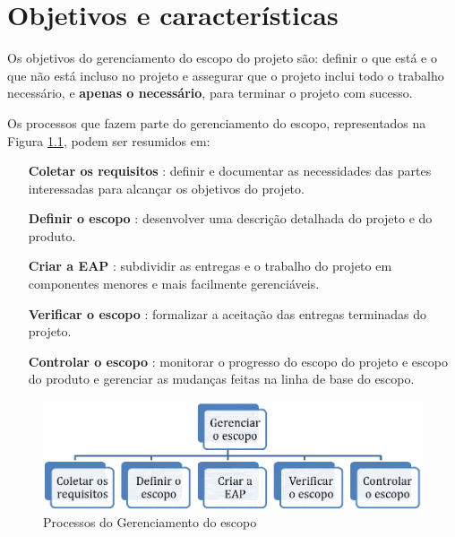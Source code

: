\chapter{Objetivos e características}

Os objetivos do gerenciamento do escopo do projeto são: definir o que está e o que não está incluso no projeto e assegurar que o projeto inclui todo o trabalho necessário, e \textbf{apenas o necessário}, para terminar o projeto com sucesso.

Os processos que fazem parte do gerenciamento do escopo, representados na Figura \ref{fig:proc:ger:escopo}, podem ser resumidos em:

\begin{itemize}
	
	\item[\textbf{Coletar os requisitos}]: definir e documentar as necessidades das partes interessadas para alcançar os objetivos do projeto.
	
	\item[\textbf{Definir o escopo}]: desenvolver uma descrição detalhada do projeto e do produto.
	
	\item[\textbf{Criar a EAP}]: subdividir as entregas e o trabalho do projeto em componentes menores e mais facilmente gerenciáveis.
	
	\item[\textbf{Verificar o escopo}]: formalizar a aceitação das entregas terminadas do projeto.
	
	\item[\textbf{Controlar o escopo}]: monitorar o progresso do escopo do projeto e escopo do produto e gerenciar as mudanças feitas na linha de base do escopo.	

\end{itemize}

\begin{figure}[!h]
	\centering
	\includegraphics[scale=0.75]{Figuras/gerenciamento_escopo.png}
	\caption{Processos do Gerenciamento do escopo}
	\label{fig:proc:ger:escopo}
\end{figure}

